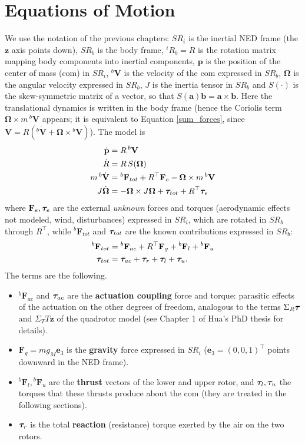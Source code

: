 \documentclass[10pt, a4paper]{report}
\begin{document}
\section{Equations of Motion}
We use the notation of the previous chapters: $SR_i$ is the inertial NED frame (the $\mathbf z$ axis points down), $SR_b$ is the body frame, ${}^iR_b=R$ is the rotation matrix mapping body components into inertial components, $\mathbf p$ is the position of the center of mass (com) in $SR_i$, ${}^b\mathbf V$ is the velocity of the com expressed in $SR_b$, $\boldsymbol{\Omega}$ is the angular velocity expressed in $SR_b$, $J$ is the inertia tensor in $SR_b$ and $S(\cdot)$ is the skew-symmetric matrix of a vector, so that $S(\mathbf a)\mathbf b=\mathbf a\times\mathbf b$. Here the translational dynamics is written in the body frame (hence the Coriolis term $\boldsymbol{\Omega}\times m\,{}^b\mathbf V$ appears; it is equivalent to Equation \eqref{sum_forces}, since $\dot{\mathbf V}=R({}^b\dot{\mathbf V}+\boldsymbol{\Omega}\times{}^b\mathbf V)$). The model is
\begin{align}
    \dot{\mathbf p}&=R\,{}^b\mathbf V\\
    \dot R&=R\,S(\boldsymbol{\Omega})\\
    m\,{}^b\dot{\mathbf V}&={}^b\mathbf F_{tot}+R^\top\mathbf F_e-\boldsymbol{\Omega}\times m\,{}^b\mathbf V\label{ing_trans}\\
    J\dot{\boldsymbol{\Omega}}&=-\boldsymbol{\Omega}\times J\boldsymbol{\Omega}+{\boldsymbol{\tau}}_{tot}+R^\top{\boldsymbol{\tau}}_e\label{ing_rot}
\end{align}
where $\mathbf F_e,{\boldsymbol{\tau}}_e$ are the external \textit{unknown} forces and torques (aerodynamic effects not modeled, wind, disturbances) expressed in $SR_i$, which are rotated in $SR_b$ through $R^\top$, while ${}^b\mathbf F_{tot}$ and ${\boldsymbol{\tau}}_{tot}$ are the known contributions expressed in $SR_b$:
\begin{align}
    {}^b\mathbf F_{tot}&={}^b\mathbf F_{ac}+R^\top\mathbf F_g+{}^b\mathbf F_l+{}^b\mathbf F_u\\
    {\boldsymbol{\tau}}_{tot}&={\boldsymbol{\tau}}_{ac}+{\boldsymbol{\tau}}_r+{\boldsymbol{\tau}}_l+{\boldsymbol{\tau}}_u.
\end{align}
The terms are the following.
\begin{itemize}
    \item ${}^b\mathbf F_{ac}$ and ${\boldsymbol{\tau}}_{ac}$ are the \textbf{actuation coupling} force and torque: parasitic effects of the actuation on the other degrees of freedom, analogous to the terms $\Sigma_R{\boldsymbol{\tau}}$ and $\Sigma_T T\mathbf z$ of the quadrotor model (see Chapter 1 of Hua's PhD thesis for details).
    \item $\mathbf F_g=mg_M\mathbf e_3$ is the \textbf{gravity} force expressed in $SR_i$ ($\mathbf e_3=(0,0,1)^\top$ points downward in the NED frame).
    \item ${}^b\mathbf F_l,{}^b\mathbf F_u$ are the \textbf{thrust} vectors of the lower and upper rotor, and ${\boldsymbol{\tau}}_l,{\boldsymbol{\tau}}_u$ the torques that these thrusts produce about the com (they are treated in the following sections).
    \item ${\boldsymbol{\tau}}_r$ is the total \textbf{reaction} (resistance) torque exerted by the air on the two rotors.
\end{itemize}
\end{document}
